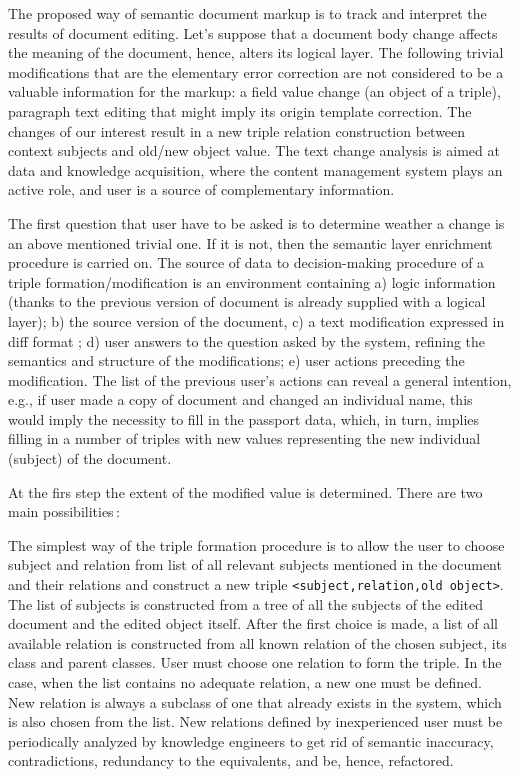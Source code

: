 \documentclass[conference]{IEEEtran}
\begin{document}
The proposed way of semantic document markup is to track and interpret
the results of document editing.  Let's suppose that a document body
change affects the meaning of the document, hence, alters its logical
layer.  The following trivial modifications that are the elementary
error correction are not considered to be a valuable information for
the markup: a field value change (an object of a triple), paragraph
text editing that might imply its origin template correction.  The
changes of our interest result in a new triple relation construction
between context subjects and old/new object value.  The text change
analysis is aimed at data and knowledge acquisition, where the content
management system plays an active role, and user is a source of
complementary information.

The first question that user have to be asked is to determine weather
a change is an above mentioned trivial one.  If it is not, then the
semantic layer enrichment procedure is carried on.  The source of data
to decision-making procedure of a triple formation/modification is an
environment containing a) logic information (thanks to the previous
version of document is already supplied with a logical layer); b) the
source version of the document, c) a text modification expressed in
diff format \cite{b9}; d) user answers to the question asked by the
system, refining the semantics and structure of the modifications; e)
user actions preceding the modification.  The list of the previous
user's actions can reveal a general intention, e.g., if user made a
copy of document and changed an individual name, this would imply the
necessity to fill in the passport data, which, in turn, implies
filling in a number of triples with new values representing the new
individual (subject) of the document.

At the firs step the extent of the modified value is determined.
There are two main possibilities\,:

The simplest way of the triple formation procedure is to allow the
user to choose subject and relation from list of all relevant subjects
mentioned in the document and their relations and construct a new
triple \texttt{<subject,relation,old object>}.  The list of subjects
is constructed from a tree of all the subjects of the edited document
and the edited object itself.  After the first choice is made, a list
of all available relation is constructed from all known relation of
the chosen subject, its class and parent classes.  User must choose
one relation to form the triple.  In the case, when the list contains
no adequate relation, a new one must be defined.  New relation is
always a subclass of one that already exists in the system, which is
also chosen from the list.  New relations defined by inexperienced user
must be periodically analyzed by knowledge engineers to get rid of
semantic inaccuracy, contradictions, redundancy to the equivalents,
and be, hence, refactored.
\end{document}
